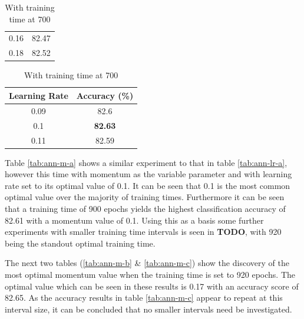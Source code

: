 \documentclass[12pt]{article}
\begin{document}
\begin{table}[H]
\begin{subtable}{.49\linewidth}
\begin{tabular}{c|c}
            0.16  & 82.47 \\
            0.18  & 82.52 \\
            \bottomrule
          \end{tabular}
          \label{tab:ann-lr-c}
        \end{subtable}
        \begin{subtable}{.49\linewidth}
          \centering
          \caption{With training time at 700}
          \begin{tabular}{c|c}
            \toprule
            \multicolumn{1}{l|}{Learning Rate} & \multicolumn{1}{l}{Accuracy (\%)} \\
            \midrule
            0.09  & 82.6 \\
            0.1   & \textbf{82.63} \\
            0.11  & 82.59 \\
            \bottomrule
          \end{tabular}
          \label{tab:ann-lr-d}
        \end{subtable}
        \label{tab:ann-lr}
      \end{table}
      \onehalfspacing

      Table \ref{tab:ann-m-a} shows a similar experiment to that in table \ref{tab:ann-lr-a}, however this time with momentum as the variable parameter and with learning rate set to its optimal value of 0.1. It can be seen that 0.1 is the most common optimal value over the majority of training times. Furthermore it can be seen that a training time of 900 epochs yields the highest classification accuracy of 82.61 with a momentum value of 0.1. Using this as a basis some further experiments with smaller training time intervals is seen in \textbf{TODO}, with 920 being the standout optimal training time.

      The next two tables (\ref{tab:ann-m-b} \& \ref{tab:ann-m-c}) show the discovery of the most optimal momentum value when the training time is set to 920 epochs. The optimal value which can be seen in these results is 0.17 with an accuracy score of 82.65. As the accuracy results in table \ref{tab:ann-m-c} appear to repeat at this interval size, it can be concluded that no smaller intervals need be investigated.
\end{document}
